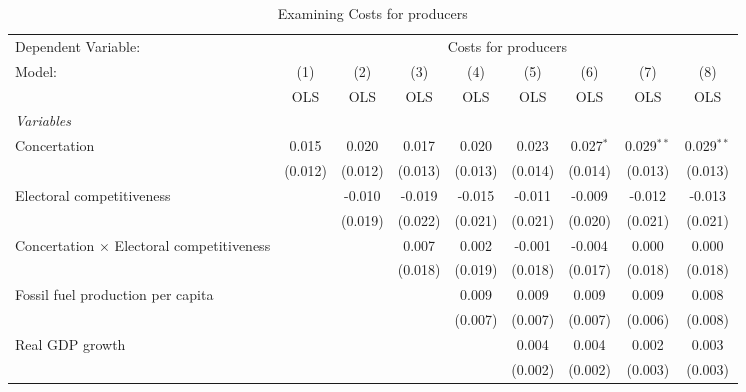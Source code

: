 
\begin{table}[htbp]
   \caption{Examining Costs for producers}
   \centering
   \begin{tabular}{lcccccccc}
      \toprule
      Dependent Variable: & \multicolumn{8}{c}{Costs for producers}\\
      Model:                                           & (1)     & (2)     & (3)     & (4)     & (5)     & (6)         & (7)          & (8)\\  
                                                       &  OLS    & OLS     & OLS     & OLS     & OLS     & OLS         & OLS          & OLS\\  
      \midrule
      \emph{Variables}\\
      Concertation                                     & 0.015   & 0.020   & 0.017   & 0.020   & 0.023   & 0.027$^{*}$ & 0.029$^{**}$ & 0.029$^{**}$\\   
                                                       & (0.012) & (0.012) & (0.013) & (0.013) & (0.014) & (0.014)     & (0.013)      & (0.013)\\   
      Electoral competitiveness                        &         & -0.010  & -0.019  & -0.015  & -0.011  & -0.009      & -0.012       & -0.013\\   
                                                       &         & (0.019) & (0.022) & (0.021) & (0.021) & (0.020)     & (0.021)      & (0.021)\\   
      Concertation $\times$ Electoral competitiveness  &         &         & 0.007   & 0.002   & -0.001  & -0.004      & 0.000        & 0.000\\   
                                                       &         &         & (0.018) & (0.019) & (0.018) & (0.017)     & (0.018)      & (0.018)\\   
      Fossil fuel production per capita                &         &         &         & 0.009   & 0.009   & 0.009       & 0.009        & 0.008\\   
                                                       &         &         &         & (0.007) & (0.007) & (0.007)     & (0.006)      & (0.008)\\   
      Real GDP growth                                  &         &         &         &         & 0.004   & 0.004       & 0.002        & 0.003\\   
                                                       &         &         &         &         & (0.002) & (0.002)     & (0.003)      & (0.003)\\   

\end{tabular}
\end{table}
